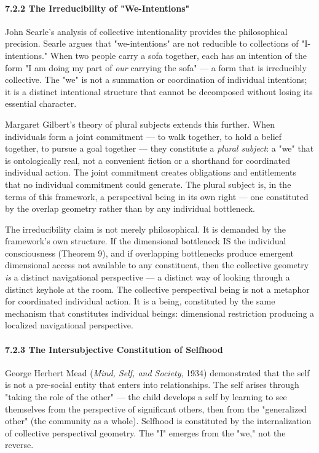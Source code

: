 \paragraph*{7.2.2 The Irreducibility of "We-Intentions"}


John Searle's analysis of collective intentionality provides the philosophical precision. Searle argues that "we-intentions" are not reducible to collections of "I-intentions." When two people carry a sofa together, each has an intention of the form "I am doing my part of \textit{our} carrying the sofa" — a form that is irreducibly collective. The "we" is not a summation or coordination of individual intentions; it is a distinct intentional structure that cannot be decomposed without losing its essential character.


Margaret Gilbert's theory of plural subjects extends this further. When individuals form a joint commitment — to walk together, to hold a belief together, to pursue a goal together — they constitute a \textit{plural subject}: a "we" that is ontologically real, not a convenient fiction or a shorthand for coordinated individual action. The joint commitment creates obligations and entitlements that no individual commitment could generate. The plural subject is, in the terms of this framework, a perspectival being in its own right — one constituted by the overlap geometry rather than by any individual bottleneck.


The irreducibility claim is not merely philosophical. It is demanded by the framework's own structure. If the dimensional bottleneck IS the individual consciousness (Theorem 9), and if overlapping bottlenecks produce emergent dimensional access not available to any constituent, then the collective geometry \textit{is} a distinct navigational perspective — a distinct way of looking through a distinct keyhole at the room. The collective perspectival being is not a metaphor for coordinated individual action. It is a being, constituted by the same mechanism that constitutes individual beings: dimensional restriction producing a localized navigational perspective.


\paragraph*{7.2.3 The Intersubjective Constitution of Selfhood}


George Herbert Mead (\textit{Mind, Self, and Society}, 1934) demonstrated that the self is not a pre-social entity that enters into relationships. The self arises through "taking the role of the other" — the child develops a self by learning to see themselves from the perspective of significant others, then from the "generalized other" (the community as a whole). Selfhood is constituted by the internalization of collective perspectival geometry. The "I" emerges from the "we," not the reverse.



